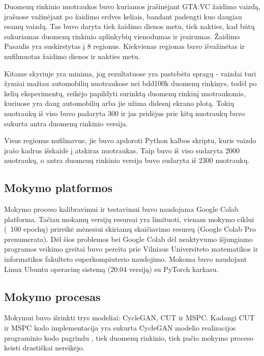 \documentclass{VUMIFPSkursinis}
\begin{document}
            Duomenų rinkinio nuotraukos buvo kuriamos įrašinėjant GTA:VC žaidimo vaizdą, įrašuose važinėjant po žaidimo erdves keliais, bandant padengti kuo daugiau esamų vaizdų. Tas buvo daryta tiek žaidimo dienos metu, tiek nakties, kad būtų sukuriamas duomenų rinkinio aplinkybių vienodumas ir įvairumas. Žaidimo Pasaulis yra suskirstytas į 8 regionus. Kiekvienas regionas buvo išvažinėtas ir nufilmuotas žaidimo dienos ir nakties metu.
            
            Kitame skyriuje yra minima, jog rezultatuose yra pastebėta spragų - vaizdai turi žymiai mažiau automobilių nuotraukose nei bdd100k duomenų rinkinys, todėl po kelių eksperimentų, reikėjo papildyti surinktą duomenų rinkinį nuotraukomis, kuriuose yra daug automobilių arba jie užima didesnį ekrano plotą. Tokių nuotraukų iš viso buvo padaryta 300 ir jas pridėjus prie kitų nuotraukų buvo sukurta antra duomenų rinkinio versija.
            
            Visus regionus nufilmavus, jie buvo apdoroti Python kalbos skriptu, kuris vaizdo įrašo kadrus išskaidė į atskiras nuotraukas. Taip buvo iš viso sudaryta 2000 nuotraukų, o antra duomenų rinkinio versija buvo sudaryta iš 2300 nuotraukų.
        
        \subsection{Mokymo platformos} %
            Mokymo proceso kalibravimui ir testavimui buvo naudojama Google Colab platforma. Tačiau mokamų versijų resursai yra limituoti, vienam mokymo ciklui (~100 epochų) prireikė mėnesiui skiriamų skaičiavimo resursų (Google Colab Pro prenumerata). Dėl šios problemos bei Google Colab dėl neaktyvumo išjungiamo programos veikimo greitai buvo pereita prie Vilniaus Universiteto matematikos ir informatikos fakulteto superkompiuterio naudojimo.
            Mokoma buvo naudojant Linux Ubuntu operacinę sistemą (20.04 versiją) su PyTorch karkasu.
        \subsection{Mokymo procesas} %
            Mokymui buvo išrinkti trys modeliai: CycleGAN, CUT ir MSPC. Kadangi CUT ir MSPC kodo implementacija yra sukurta CycleGAN modelio realizacijos programinio kodo pagrindu \cite{CycleGANRepo}, tiek duomenų rinkinio, tiek pačio mokymo proceso keisti drastiškai nereikėjo. 
\end{document}
